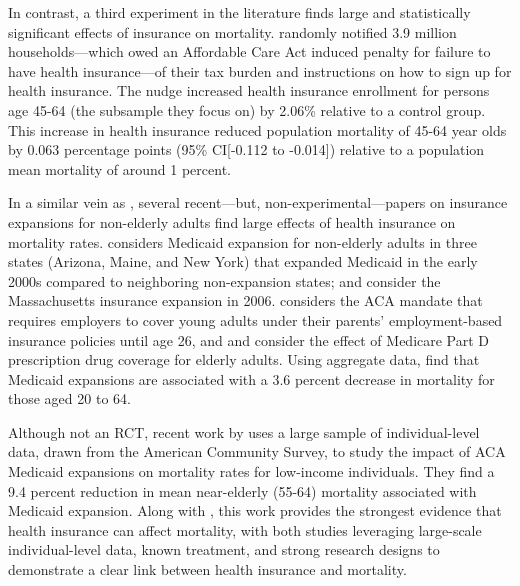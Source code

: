 \documentclass[12pt]{article}%
\begin{document}
In contrast, a third experiment in the literature finds large and statistically significant effects of insurance on mortality.
\citet{goldinHealthInsuranceMortality2021} randomly notified 3.9 million households---which owed an Affordable Care Act induced penalty for failure to have health insurance---of their tax burden and instructions on how to sign up for health insurance.  
The nudge increased health insurance enrollment for persons age 45-64 (the subsample they focus on) by 2.06\% relative to a control group. 
This increase in health insurance reduced population mortality of 45-64 year olds by 0.063 percentage points (95\% CI[-0.112 to -0.014]) relative to a population mean mortality of around 1 percent. 

In a similar vein as \citet{goldinHealthInsuranceMortality2021}, several recent---but, non-experimental---papers on insurance expansions for non-elderly adults find large effects of health insurance on mortality rates. 
\citet{sommersMortalityAccessCare2012} considers Medicaid expansion for non-elderly adults in three states (Arizona, Maine, and New York) that expanded Medicaid in the early 2000s compared to neighboring non-expansion states; \citet{sommersChangesMortalityMassachusetts2014} and \citet{powellImperfectSyntheticControlsc} consider the Massachusetts insurance expansion in 2006.  
\citet{mcclellanAffordableCareAct2017a} considers the ACA mandate that requires employers to cover young adults under their parents’ employment-based insurance policies until age 26, and \citet{dunnDoesMedicarePart2019} and \citet{huhMedicareMortality2017} consider the effect of Medicare Part D prescription drug coverage for elderly adults. 
Using aggregate data, \citet{borgschulteDidACAMedicaid2020} find that Medicaid expansions are associated with a 3.6 percent decrease in mortality for those aged 20 to 64. 

Although not an RCT, recent work by \citet{millerMedicaidMortalityNew2019} uses a large sample of individual-level data, drawn from the American Community Survey, to study the impact of ACA Medicaid expansions on mortality rates for low-income individuals. 
They find a 9.4 percent reduction in mean near-elderly (55-64) mortality associated with Medicaid expansion. 
Along with \citet{goldinHealthInsuranceMortality2021}, this work provides the strongest evidence that health insurance can affect mortality, with both studies leveraging large-scale individual-level data, known treatment, and strong research designs to demonstrate a clear link between health insurance and mortality. 
\end{document}
